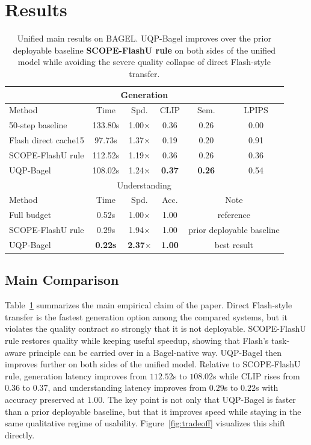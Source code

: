 \documentclass{article}
\begin{document}
\section{Results}
\begin{table}[t]
\caption{Unified main results on BAGEL. UQP-Bagel improves over the prior deployable baseline \textbf{SCOPE-FlashU rule} on both sides of the unified model while avoiding the severe quality collapse of direct Flash-style transfer.}
\label{tab:main}
\centering
\small
\begin{tabular}{lccccc}
\toprule
\multicolumn{6}{c}{Generation} \\
\midrule
Method & Time & Spd. & CLIP & Sem. & LPIPS \\
\midrule
50-step baseline & 133.80s & 1.00$\times$ & 0.36 & 0.26 & 0.00 \\
Flash direct cache15 & 97.73s & 1.37$\times$ & 0.19 & 0.20 & 0.91 \\
SCOPE-FlashU rule & 112.52s & 1.19$\times$ & 0.36 & 0.26 & 0.36 \\
UQP-Bagel & 108.02s & 1.24$\times$ & \textbf{0.37} & \textbf{0.26} & 0.54 \\
\midrule
\multicolumn{6}{c}{Understanding} \\
\midrule
Method & Time & Spd. & Acc. & \multicolumn{2}{c}{Note} \\
\midrule
Full budget & 0.52s & 1.00$\times$ & 1.00 & \multicolumn{2}{c}{reference} \\
SCOPE-FlashU rule & 0.29s & 1.94$\times$ & 1.00 & \multicolumn{2}{c}{prior deployable baseline} \\
UQP-Bagel & \textbf{0.22s} & \textbf{2.37$\times$} & \textbf{1.00} & \multicolumn{2}{c}{best result} \\
\bottomrule
\end{tabular}
\end{table}

\subsection{Main Comparison}
Table~\ref{tab:main} summarizes the main empirical claim of the paper. Direct Flash-style transfer is the fastest generation option among the compared systems, but it violates the quality contract so strongly that it is not deployable. SCOPE-FlashU rule restores quality while keeping useful speedup, showing that Flash's task-aware principle can be carried over in a Bagel-native way. UQP-Bagel then improves further on both sides of the unified model. Relative to SCOPE-FlashU rule, generation latency improves from $112.52$s to $108.02$s while CLIP rises from $0.36$ to $0.37$, and understanding latency improves from $0.29$s to $0.22$s with accuracy preserved at $1.00$. The key point is not only that UQP-Bagel is faster than a prior deployable baseline, but that it improves speed while staying in the same qualitative regime of usability. Figure~\ref{fig:tradeoff} visualizes this shift directly.
\end{document}

